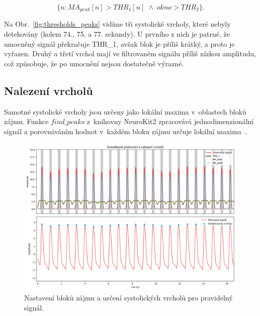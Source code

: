 \begin{equation}
	\{n : MA_{peak}[n] > THR_1[n] \; \land \; okno > THR_2\}.
	\label{eq:blocks}
\end{equation}

Na Obr.~\ref{fig:thresholds_peaks} vidíme tři systolické vrcholy, které nebyly detekovány (kolem 74., 75. a 77. sekundy).
U prvního z nich je patrné, že umocněný signál překračuje \acs{THR_1}, avšak blok je příliš krátký, a proto je vyřazen.
Druhý a třetí vrchol mají ve filtrovaném signálu příliš nízkou amplitudu, což způsobuje, že po umocnění nejsou dostatečně výrazné.

\subsection*{Nalezení vrcholů}
\label{sec:peaks}

Samotné systolické vrcholy jsou určeny jako lokální maxima v~oblastech bloků zájmu.
Funkce \(find\_peaks\) z~knihovny NeuroKit2 zpracovává jednodimenzionální signál a porovnáváním hodnot v~každém bloku zájmu určuje lokální maxima~\cite{NeuroKit2}.

\begin{figure}[t]
	\vspace{-9mm}
	\centering
	\includegraphics[width=1\textwidth]{./obrazky/Elgendi_THR_Peaks_Clean.png}
	\vspace{-10mm}
	\caption[Elgendiho zpracování pravidelného signálu]{Nastavení bloků zájmu a určení systolických vrcholů pro pravidelný signál.}
	\label{fig:thresholds_peaks_clean}
\end{figure}

